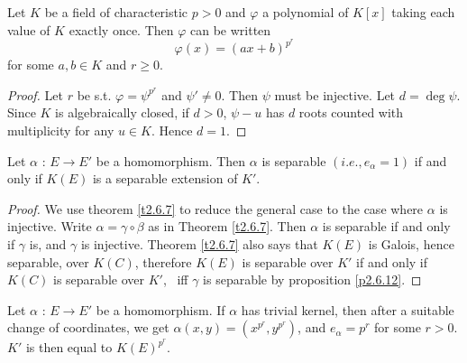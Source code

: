 \begin{exo}
\label{e2.6.7}
Let $K$ be a field of characteristic $p>0$ and $\varphi$ a polynomial of $K[x]$ taking each value of $K$ exactly once. Then $\varphi$ can be written
\begin{equation}
\label{eq2.21}
\varphi(x)=(ax+b)^{p^{r}}
\end{equation}
for some $a,b\in K$ and $r\geq 0$.
\end{exo}

\begin{proof}
Let $r$ be s.t. $\varphi = \psi^{p^r}$ and $\psi'\neq 0$. Then $\psi$ must be injective. Let $d = \deg \psi$. Since $K$ is algebraically closed, if $d>0$, $\psi - u$ has $d$ roots counted with multiplicity for any $u \in K$. Hence $d=1$.
\end{proof}


\begin{coro}
\label{c2.6.4}
Let $\alpha$ : $E\rightarrow E'$ be a homomorphism. Then $\alpha$ is separable $(i.e.,e_{\alpha}=1)$ if and only if $K(E)$ is a separable extension of $K'$.
\end{coro}

\begin{proof}
We use theorem \ref{t2.6.7} to reduce the general case to the case where $\alpha$ is injective.
Write $\alpha =\gamma\circ\beta$ as in Theorem \ref{t2.6.7}. Then $\alpha$ is separable if and only if $\gamma$ is, and $\gamma$ is injective. Theorem \ref{t2.6.7} also says that $K(E)$ is Galois, hence separable, over $K(C)$, therefore $K(E)$ is separable over $K'$ if and only if $K(C)$ is separable over $K'$, \ie\ iff $\gamma$ is separable by proposition \ref{p2.6.12}.
\end{proof}

\begin{coro}
\label{c2.6.5}
Let $\alpha$ : $E\rightarrow E'$ be a homomorphism. If $\alpha$ has trivial kernel, then after a suitable change of coordinates, we get $\alpha(x, y)=(x^{p^{r}}, y^{p^{r}})$, and $e_{\alpha}=p^{r}$ for some $r>0$. $K'$ is then equal to $K(E)^{p^{r}}$.
\end{coro}

